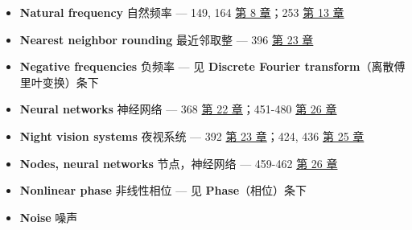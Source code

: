 \begin{itemize}
\tightlist
\item
  \textbf{Natural frequency} 自然频率 --- 149, 164 
  \hyperref[ch-08]{第 8 章}；253  \hyperref[ch-13]{第 13 章}
\item
  \textbf{Nearest neighbor rounding} 最近邻取整 --- 396 
  \hyperref[ch-23]{第 23 章}
\item
  \textbf{Negative frequencies} 负频率 --- 见 \textbf{Discrete Fourier
  transform}（离散傅里叶变换）条下
\item
  \textbf{Neural networks} 神经网络 --- 368 
  \hyperref[ch-22]{第 22 章}；451-480  \hyperref[ch-26]{第 26
  章}
\item
  \textbf{Night vision systems} 夜视系统 --- 392 
  \hyperref[ch-23]{第 23 章}；424, 436  \hyperref[ch-25]{第 25
  章}
\item
  \textbf{Nodes, neural networks} 节点，神经网络 --- 459-462 
  \hyperref[ch-26]{第 26 章}
\item
  \textbf{Nonlinear phase} 非线性相位 --- 见 \textbf{Phase}（相位）条下
\item
  \textbf{Noise} 噪声


\end{itemize}
